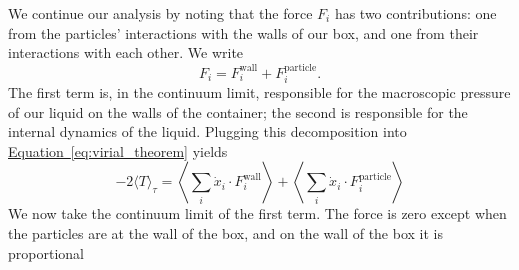 \documentclass[a4paper,12pt]{scrreprt}
\theoremstyle{definition}
\theoremstyle{plain}
\theoremstyle{remark}
\begin{document}
We continue our analysis by noting that the force $F_{i}$ has two contributions: one from the particles' interactions with the walls of our box, and one from their interactions with each other. We write
\begin{equation*}
  F_{i} = F_{i}^{\mathrm{wall}} + F_{i}^{\mathrm{particle}}.
\end{equation*}
The first term is, in the continuum limit, responsible for the macroscopic pressure of our liquid on the walls of the container; the second is responsible for the internal dynamics of the liquid. Plugging this decomposition into \hyperref[eq:virial_theorem]{Equation~\ref*{eq:virial_theorem}} yields
\begin{equation*}
  -2\langle T \rangle_{\tau} = \left\langle \sum_{i} \dot{x}_{i} \cdot F_{i}^{\mathrm{wall}} \right\rangle + \left\langle \sum_{i} \dot{x}_{i} \cdot F_{i}^{\mathrm{particle}} \right\rangle
\end{equation*}
We now take the continuum limit of the first term. The force is zero except when the particles are at the wall of the box, and on the wall of the box it is proportional

\printbibliography{}
\end{document}
